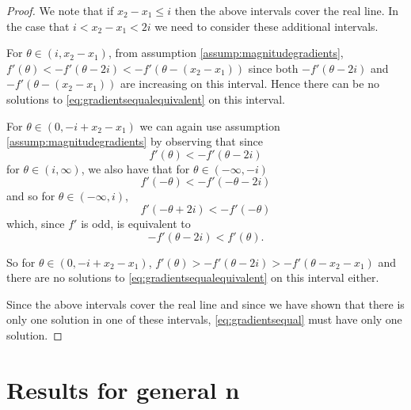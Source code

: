 \begin{proof}
			We note that if $x_2 - x_1 \leq i$ then the above intervals cover the real line. In the case that $i <x_2 - x_1 < 2i$ we need to consider these additional intervals.

			For $\theta \in (i,x_2 - x_1)$, from assumption \ref{assump:magnitudegradients}, $f'(\theta) < -f'(\theta - 2i) < -f'(\theta - (x_2 - x_1))$ since both $-f'(\theta - 2i)$ and $-f'(\theta - (x_2 - x_1))$ are increasing on this interval. Hence there can be no solutions to \eqref{eq:gradientsequalequivalent} on this interval.
			
			For $\theta \in (0, -i+x_2 - x_1)$ we can again use assumption \ref{assump:magnitudegradients} by observing that since 
			\begin{equation}
				f'(\theta) < -f'(\theta - 2i)
			\end{equation}
			for $\theta \in (i, \infty)$, we also have that for $\theta \in (-\infty, -i)$
			\begin{equation}
				f'(-\theta) < -f'(-\theta - 2i)
			\end{equation}
			and so for $\theta \in (-\infty, i)$,
			\begin{equation}
				f'(-\theta + 2i) < -f'(-\theta)
			\end{equation}
			which, since $f'$ is odd, is equivalent to 
			\begin{equation}
				-f'(\theta - 2i) < f'(\theta).
			\end{equation}

			So for $\theta \in (0,-i+x_2-x_1)$,  $f'(\theta)>-f'(\theta - 2i) > -f'(\theta - x_2 - x_1)$ and there are no solutions to \eqref{eq:gradientsequalequivalent} on this interval either.

			
			
			
			Since the above intervals cover the real line and since we have shown that there is only one solution in one of these intervals, \eqref{eq:gradientsequal} must have only one solution.
		\end{proof}

\section{Results for general n}
	
